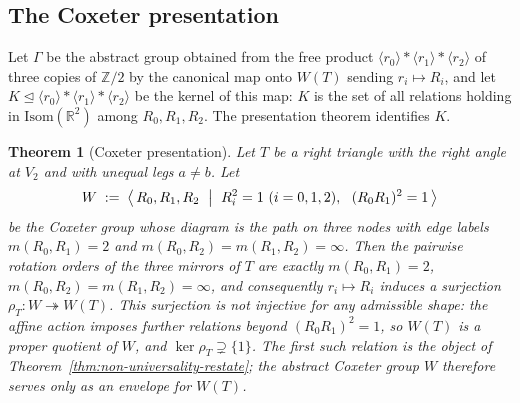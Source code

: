 \documentclass[11pt]{article}
\theoremstyle{plain}
\newtheorem{theorem}{Theorem}
\theoremstyle{definition}
\theoremstyle{remark}
\begin{document}
\subsection{The Coxeter presentation}
\label{ssec:coxeter-presentation}

Let $\Gamma$ be the abstract group obtained from the free product $\langle r_0\rangle * \langle r_1\rangle * \langle r_2\rangle$ of three copies of $\mathbb{Z}/2$ by the canonical map onto $W(T)$ sending $r_i \mapsto R_i$, and let $K \trianglelefteq \langle r_0\rangle * \langle r_1\rangle * \langle r_2\rangle$ be the kernel of this map: $K$ is the set of all relations holding in $\mathrm{Isom}(\mathbb{R}^2)$ among $R_0, R_1, R_2$. The presentation theorem identifies $K$.

\begin{theorem}[Coxeter presentation]
\label{thm:coxeter-presentation}
Let $T$ be a right triangle with the right angle at $V_2$ and with unequal legs $a \neq b$. Let
\[
  W \;:=\; \bigl\langle\, R_0, R_1, R_2 \ \bigm|\ R_i^2 = 1\ (i=0,1,2),\ \ (R_0 R_1)^2 = 1 \,\bigr\rangle
\]
be the Coxeter group whose diagram is the path on three nodes with edge labels $m(R_0,R_1) = 2$ and $m(R_0,R_2) = m(R_1,R_2) = \infty$. Then the pairwise rotation orders of the three mirrors of $T$ are exactly $m(R_0,R_1) = 2$, $m(R_0,R_2) = m(R_1,R_2) = \infty$, and consequently $r_i \mapsto R_i$ induces a \emph{surjection} $\rho_T \colon W \twoheadrightarrow W(T)$. This surjection is \emph{not} injective for any admissible shape: the affine action imposes further relations beyond $(R_0R_1)^2 = 1$, so $W(T)$ is a \emph{proper} quotient of $W$, and $\ker\rho_T \supsetneq \{1\}$. The first such relation is the object of Theorem~\ref{thm:non-universality-restate}; the abstract Coxeter group $W$ therefore serves only as an \emph{envelope} for $W(T)$.
\end{theorem}
\end{document}
